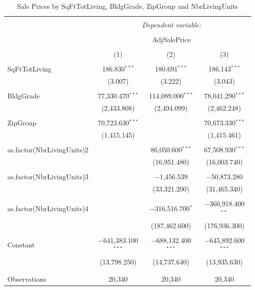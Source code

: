 \documentclass[12pt,a4paper,landscape]{article}
\begin{document}
\begin{table}[H] \centering 
	\caption{Sale Prices by SqFtTotLiving, BldgGrade, ZipGroup and NbrLivingUnits} 
	\label{} 
	\begin{tabular}{@{\extracolsep{5pt}}lccc} 
		\\[-1.8ex]\hline 
		\hline \\[-1.8ex] 
		& \multicolumn{3}{c}{\textit{Dependent variable:}} \\ 
		\cline{2-4} 
		\\[-1.8ex] & \multicolumn{3}{c}{AdjSalePrice} \\ 
		\\[-1.8ex] & (1) & (2) & (3)\\ 
		\hline \\[-1.8ex] 
		SqFtTotLiving & 186.830$^{***}$ & 180.691$^{***}$ & 186.143$^{***}$ \\ 
		& (3.007) & (3.222) & (3.043) \\ 
		& & & \\ 
		BldgGrade & 77,330.470$^{***}$ & 114,089.000$^{***}$ & 78,041.290$^{***}$ \\ 
		& (2,433.808) & (2,494.099) & (2,462.248) \\ 
		& & & \\ 
		ZipGroup & 70,723.630$^{***}$ &  & 70,673.330$^{***}$ \\ 
		& (1,415.145) &  & (1,415.461) \\ 
		& & & \\ 
		as.factor(NbrLivingUnits)2 &  & 86,050.600$^{***}$ & 67,508.930$^{***}$ \\ 
		&  & (16,951.480) & (16,003.740) \\ 
		& & & \\ 
		as.factor(NbrLivingUnits)3 &  & $-$1,456.539 & $-$50,873.280 \\ 
		&  & (33,321.200) & (31,465.340) \\ 
		& & & \\ 
		as.factor(NbrLivingUnits)4 &  & $-$316,516.700$^{*}$ & $-$360,918.400$^{**}$ \\ 
		&  & (187,462.600) & (176,936.300) \\ 
		& & & \\ 
		Constant & $-$641,383.100$^{***}$ & $-$688,132.400$^{***}$ & $-$645,892.600$^{***}$ \\ 
		& (13,798.250) & (14,737.640) & (13,935.630) \\ 
		& & & \\ 
		\hline \\[-1.8ex] 
		Observations & 20,340 & 20,340 & 20,340 \\ 

\end{tabular}
\end{table}
\end{document}
